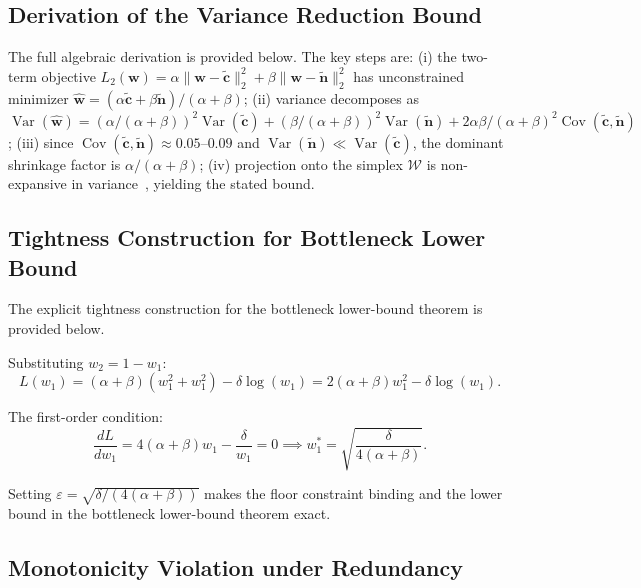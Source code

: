 \documentclass[pdflatex,sn-mathphys-num]{sn-jnl}
\begin{document}
\subsection{Derivation of the Variance Reduction Bound}
\label{app:variance-derivation}

The full algebraic derivation is provided below. The key steps are: (i) the two-term objective $L_2(\mathbf{w}) = \alpha\|\mathbf{w} - \tilde{\mathbf{c}}\|_2^2 + \beta\|\mathbf{w} - \tilde{\mathbf{n}}\|_2^2$ has unconstrained minimizer $\hat{\mathbf{w}} = (\alpha\tilde{\mathbf{c}} + \beta\tilde{\mathbf{n}})/(\alpha+\beta)$; (ii) variance decomposes as $\operatorname{Var}(\hat{\mathbf{w}}) = (\alpha/(\alpha+\beta))^2\operatorname{Var}(\tilde{\mathbf{c}}) + (\beta/(\alpha+\beta))^2\operatorname{Var}(\tilde{\mathbf{n}}) + 2\alpha\beta/(\alpha+\beta)^2\operatorname{Cov}(\tilde{\mathbf{c}}, \tilde{\mathbf{n}})$; (iii) since $\operatorname{Cov}(\tilde{\mathbf{c}}, \tilde{\mathbf{n}}) \approx 0.05$--$0.09$ and $\operatorname{Var}(\tilde{\mathbf{n}}) \ll \operatorname{Var}(\tilde{\mathbf{c}})$, the dominant shrinkage factor is $\alpha/(\alpha+\beta)$; (iv) projection onto the simplex $\mathcal{W}$ is non-expansive in variance~\cite{wang2013projection}, yielding the stated bound.

\subsection{Tightness Construction for Bottleneck Lower Bound}
\label{app:bottleneck-tightness}

The explicit tightness construction for the bottleneck lower-bound theorem is provided below.

Substituting $w_2 = 1 - w_1$:
\begin{equation}
L(w_1) = (\alpha+\beta)(w_1^2 + w_1^2) - \delta\log(w_1) = 2(\alpha+\beta)w_1^2 - \delta\log(w_1).
\end{equation}

The first-order condition:
\begin{equation}
\frac{dL}{dw_1} = 4(\alpha+\beta)w_1 - \frac{\delta}{w_1} = 0 \implies w_1^* = \sqrt{\frac{\delta}{4(\alpha+\beta)}}.
\end{equation}

Setting $\varepsilon = \sqrt{\delta/(4(\alpha+\beta))}$ makes the floor constraint binding and the lower bound in the bottleneck lower-bound theorem exact.

\subsection{Monotonicity Violation under Redundancy}
\label{app:monotonicity-redundancy}
\end{document}
